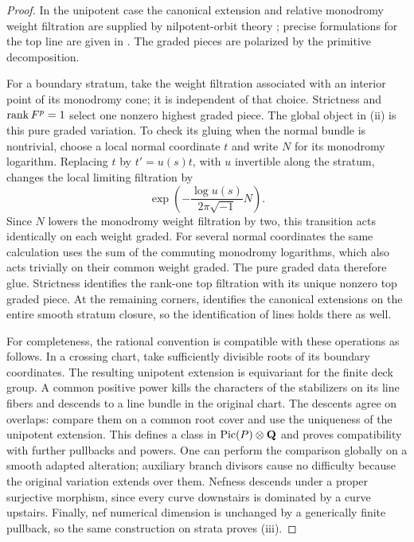 \begin{proof}
In the unipotent case the canonical extension and relative monodromy
weight filtration are supplied by nilpotent-orbit theory
\cite{Schmid,CKS}; precise formulations for the top
line are given in \cite[\S 2.5.3, Lemma 2.16, Lemma 5.6]{BFMT}.  The
graded pieces are polarized by the primitive decomposition.

For a boundary stratum, take the weight filtration associated with an
interior point of its monodromy cone; it is independent of that choice.
Strictness and $\operatorname{rank} F^p=1$ select one nonzero highest graded piece.
The global object in (ii) is this pure graded variation.  To check its
gluing when the normal bundle is nontrivial, choose a local normal
coordinate $t$ and write $N$ for its monodromy logarithm.  Replacing $t$
by $t'=u(s)t$, with $u$ invertible along the stratum, changes the local
limiting filtration by
\[
 \exp\left(-\frac{\log u(s)}{2\pi\sqrt{-1}}N\right).
\]
Since $N$ lowers the monodromy weight filtration by two, this transition
acts identically on each weight graded.  For several normal coordinates
the same calculation uses the sum of the commuting monodromy logarithms,
which also acts trivially on their common weight graded.  The pure
graded data therefore glue.  Strictness identifies the rank-one top
filtration with its unique nonzero top graded piece.  At the remaining
corners, \cite[\S 2.5.3 and Lemma 2.16(3)]{BFMT} identifies the canonical
extensions on the entire smooth stratum closure, so the identification
of lines holds there as well.

For completeness, the rational convention is compatible with these
operations as follows.  In a crossing chart, take sufficiently divisible
roots of its boundary coordinates.  The resulting unipotent extension
is equivariant for the finite deck group.  A common positive power kills
the characters of the stabilizers on its line fibers and descends to a
line bundle in the original chart.  The descents agree on overlaps:
compare them on a common root cover and use the uniqueness of the
unipotent extension.  This defines a class in
$\operatorname{Pic}(P)\otimes\mathbf Q$ and proves compatibility with further
pullbacks and powers.  One can perform the comparison globally on a
smooth adapted alteration; auxiliary branch divisors cause no difficulty
because the original variation extends over them.  Nefness descends
under a proper surjective morphism, since every curve downstairs is
dominated by a curve upstairs.  Finally, nef numerical dimension is
unchanged by a generically finite pullback, so the same construction on
strata proves (iii).
\end{proof}

